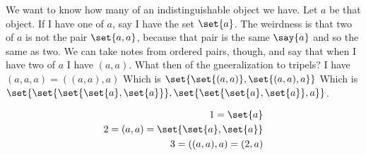 

We want to know how many of an indistinguishable object we have.
Let $a$ be that object.
If I have one of $a$, say I have the set $\set{a}$.
The weirdness is that two of $a$ is not the pair $\set{a,a}$, because that pair is the same $\say{a}$ and so the same as two.
We can take notes from ordered pairs, though, and say that when I have two of $a$ I have $(a,a)$.
What then of the gneeralization to tripels?
I have $(a, a, a) = ((a, a), a)$
Which is $\set{\set{(a, a)}, \set{(a, a), a}}$
Which is $\set{\set{\set{\set{a}, \set{a}}}, \set{\set{\set{a}, \set{a}}, a}}$.

\[
  \begin{aligned}
  1 = \set{a} \\
  2  = (a, a) = \set{\set{a}, \set{a}} \\
  3  = ((a, a), a) = (2, a)
  \end{aligned}
\]
